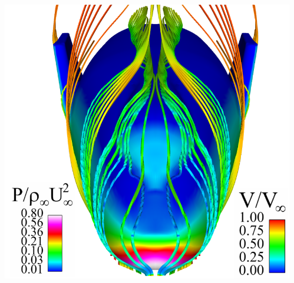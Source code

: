 \documentclass[compress,11pt]{beamer}
\begin{document}
\frame
{
  \begin{columns}[t]
    \vspace{-1em}
    \begin{block}{}
    \end{block}
    
      \begin{center}
	\includegraphics[width=\textwidth]{figures/x38/press}
      \end{center}
  \end{columns}
}
\end{document}
